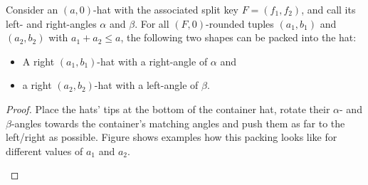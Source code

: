 \documentclass[a4paper,style=print,bibliography=totoc,nexus,lnum,extramargin]{tubsbook}
\begin{document}
\begin{lemma}\label{th:hatsinhat}
    Consider an $(a,0)$-hat with the associated split key $F = (f_1, f_2)$, and call its left- and right-angles $\alpha$ and $\beta$.
    For all $(F,0)$-rounded tuples $(a_1, b_1)$ and $(a_2, b_2)$ with $a_1 + a_2 \le a$, the following two shapes can be packed into the hat:
    \begin{itemize}
        \item A right $(a_1,b_1)$-hat with a right-angle of $\alpha$ and
        \item a right $(a_2,b_2)$-hat with a left-angle of $\beta$.
    \end{itemize}
\end{lemma}

\begin{proof}
    Place the hats' tips at the bottom of the container hat, rotate their $\alpha$- and $\beta$-angles towards the container's matching angles and push them as far to the left/right as possible. Figure  shows examples how this packing looks like for different values of $a_1$ and $a_2$.

    \begin{figure}

        \vspace{2mm}


        \vspace{2mm}



\end{figure}
\end{proof}
\end{document}
